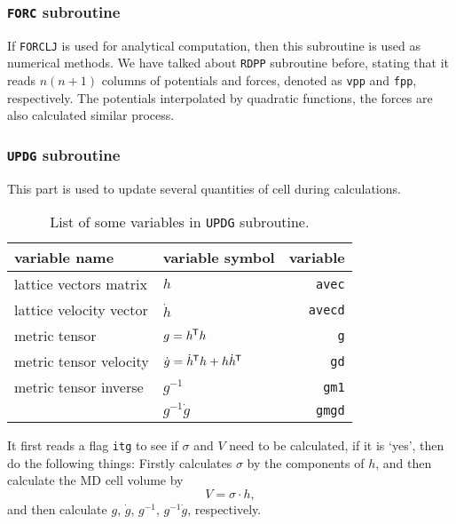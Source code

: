 \subsubsection{\texttt{FORC} subroutine}
\label{sssec:forc}

If \texttt{FORCLJ} is used for analytical computation, then this subroutine is
used as numerical methods.
We have talked about \texttt{RDPP} subroutine before, stating that it reads
$n (n+1)$ columns of potentials and forces, denoted as \texttt{vpp} and
\texttt{fpp}, respectively.
The potentials interpolated by quadratic functions, the forces are also
calculated similar process.


\subsubsection{\texttt{UPDG} subroutine}

This part is used to update several quantities of cell during calculations.

\begin{table}[htbp]
	\centering
	\caption{List of some variables in \texttt{UPDG} subroutine.}
	\begin{tabular}{@{}llr@{}}
		\toprule
		{variable name}                     & variable symbol                                 & variable       \\
		\midrule
		{lattice vectors matrix}            & $h$                                             & \texttt{avec}  \\
		{lattice velocity vector}           & $\dot{h}$                                       & \texttt{avecd} \\
		{metric tensor}                     & $g = h ^{\mkern-1.5mu\mathsf{T}} h$                                 & \texttt{g}     \\
		{metric tensor velocity}            & $\dot{g} = \dot{ h }^{\mkern-1.5mu\mathsf{T}} h + h \dot{ h }^{\mkern-1.5mu\mathsf{T}}$ & \texttt{gd}    \\
		{metric tensor inverse}             & $g^{-1}$                                        & \texttt{gm1}   \\
		                                                      & $g^{-1} \dot{g}$                                & \texttt{gmgd}  \\
		\bottomrule
	\end{tabular}%
	\label{tab:updg}%
\end{table}%


It first reads a flag \texttt{itg} to see if $\sigma$ and $V$ need to be calculated,
if it is `yes', then do the following things:
Firstly calculates $\sigma$ by the components of $h$, and then calculate the
MD cell volume by
\begin{equation}
	V = \sigma \cdot h,
\end{equation}
and then calculate $g$, $\dot{ g }$, $g^{-1}$, $g^{-1}\dot{g}$, respectively.


